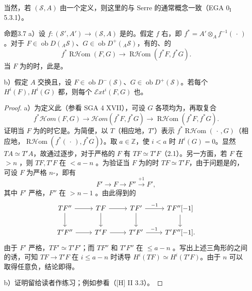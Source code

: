 当然，若 $(\mathscr S,A)$ 由一个定义，则这里的与 Serre 的通常概念一致（EGA $0_{\mathrm I}$ 5.3.1）。

\begin{SGAresult}{命题}{3.7}
a）设 $f:(\mathscr S',A')\to(\mathscr S,A)$ 是的。假定 $f$ 右，即 $f^*=A'\otimes_A f^{-1}(\,\cdot\,)$ 。对于 $F\in\operatorname{ob}D({}_A\mathscr S)$、$G\in\operatorname{ob}D^+({}_A\mathscr S)$，有的、的
\[
f^*\operatorname{R\mathcal Hom}(F,G)\longrightarrow
\operatorname{R\mathcal Hom}(f^*F,f^*G).
\]
当 $F$ 为的时，此是。

b）假定 $A$ 交换且，设 $F\in\operatorname{ob}D^-(\mathscr S)$、$G\in\operatorname{ob}D^+(\mathscr S)$。若每个 $H^i(F),H^i(G)$ 都，则每个 $\mathcal Ext^i(F,G)$ 也。
\end{SGAresult}
\begin{proof}
a）为定义此（参看 SGA 4 XVII），可设 $G$ 各项均为，再取复合
\[
f^*\mathcal Hom(F,G)\longrightarrow\mathcal Hom(f^*F,f^*G)
\longrightarrow\operatorname{R\mathcal Hom}(f^*F,f^*G).
\]
证明当 $F$ 为的时它是。为简便，以 $T$（相应地，$T'$）表示 $f^*\operatorname{R\mathcal Hom}(\,\cdot\,,G)$（相应地，$\operatorname{R\mathcal Hom}(f^*(\,\cdot\,),f^*G)$）。取 $a\in\mathbb Z$，使 $i<a$ 时 $H^i(G)=0$。显然 $TA\simeq T'A$，故通过逐步，对于严格的 $F$ 有 $TF\simeq T'F$（2.1）。另一方面，若 $F$ 在 $>n$ ，则 $TF,T'F$ 在 $<a-n$ 。为验证当 $F$ 为的时 $TF\simeq T'F$，由于问题是的，可设 $F$ 为严格 $n$-，即有
\[F'\longrightarrow F\longrightarrow F''\xrightarrow{+1}F',\]
其中 $F'$ 严格，$F''$ 在 $>n-1$ 。由此得到的
\[\begin{tikzcd}
TF''\arrow[r]\arrow[d]&TF\arrow[r]\arrow[d]&TF'\arrow[r,"{-1}"]\arrow[d]&TF''[-1]\arrow[d]\\
T'F''\arrow[r]&T'F\arrow[r]&T'F'\arrow[r,"{-1}"]&T'F''[-1].
\end{tikzcd}\]
由于 $F'$ 严格，$TF'\simeq T'F'$；而 $TF''$ 和 $T'F''$
在 $\leq a-n$ 。写出上述三角形的之间的诱，可知 $TF\to T'F$ 在 $i\leq a-n$ 时诱导 $H^i(TF)\simeq H^i(T'F)$。由于 $n$ 可以取得任意负，结论即得。

b）证明留给读者作练习；例如参看（[H] II 3.3）。
\end{proof}

